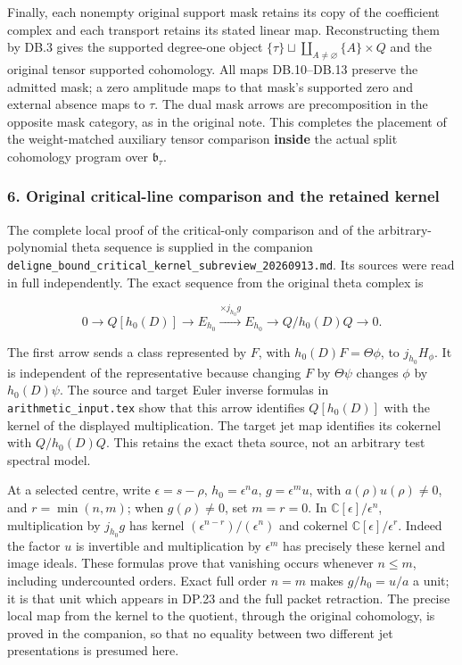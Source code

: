 \documentclass{article}
\begin{document}
Finally, each nonempty original support mask retains its copy of the coefficient complex and each transport retains its stated linear map. Reconstructing them by DB.3 gives the supported degree-one object \(\{\tau\}\sqcup\coprod_{A\ne\varnothing}\{A\}\times Q\) and the original tensor supported cohomology. All maps DB.10--DB.13 preserve the admitted mask; a zero amplitude maps to that mask's supported zero and external absence maps to \(\tau\). The dual mask arrows are precomposition in the opposite mask category, as in the original note. This completes the placement of the weight-matched auxiliary tensor comparison \textbf{inside} the actual split cohomology program over \(\mathfrak b_\tau\).

\subsubsection{6. Original critical-line comparison and the retained kernel}\label{endpoint-purity_review--original-critical-line-comparison-and-the-retained-kernel}

The complete local proof of the critical-only comparison and of the arbitrary-polynomial theta sequence is supplied in the companion \nolinkurl{deligne_bound_critical_kernel_subreview_20260913.md}. Its sources were read in full independently. The exact sequence from the original theta complex is

\[
0\longrightarrow Q[h_0(D)]\longrightarrow E_{h_0}
 \xrightarrow{\times j_{h_0}g}E_{h_0}
 \longrightarrow Q/h_0(D)Q\longrightarrow0.
\tag{DP.34}
\]

The first arrow sends a class represented by \(F\), with \(h_0(D)F=\Theta\phi\), to \(j_{h_0}H_\phi\). It is independent of the representative because changing \(F\) by \(\Theta\psi\) changes \(\phi\) by \(h_0(D)\psi\). The source and target Euler inverse formulas in \nolinkurl{arithmetic_input.tex} show that this arrow identifies \(Q[h_0(D)]\) with the kernel of the displayed multiplication. The target jet map identifies its cokernel with \(Q/h_0(D)Q\). This retains the exact theta source, not an arbitrary test spectral model.

At a selected centre, write \(\epsilon=s-\rho\), \(h_0=\epsilon^n a\), \(g=\epsilon^m u\), with \(a(\rho)u(\rho)\ne0\), and \(r=\min(n,m)\); when \(g(\rho)\ne0\), set \(m=r=0\). In \(\mathbb C[\epsilon]/\epsilon^n\), multiplication by \(j_{h_0}g\) has kernel \((\epsilon^{n-r})/(\epsilon^n)\) and cokernel \(\mathbb C[\epsilon]/\epsilon^r\). Indeed the factor \(u\) is invertible and multiplication by \(\epsilon^m\) has precisely these kernel and image ideals. These formulas prove that vanishing occurs whenever \(n\le m\), including undercounted orders. Exact full order \(n=m\) makes \(g/h_0=u/a\) a unit; it is that unit which appears in DP.23 and the full packet retraction. The precise local map from the kernel to the quotient, through the original cohomology, is proved in the companion, so that no equality between two different jet presentations is presumed here.
\end{document}
